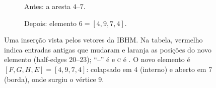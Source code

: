 \begin{figure}[ht]
\centering
\begin{subfigure}[b]{0.48\linewidth}\centering\caption{Antes: a aresta $4$--$7$.}\end{subfigure}\hfill
\begin{subfigure}[b]{0.48\linewidth}\centering\caption{Depois: elemento $6=[4,9,7,4]$.}\end{subfigure}
\par\medskip
{\scriptsize\setlength{\tabcolsep}{2.1pt}}
\caption{Uma inserção vista pelos vetores da IBHM. Na tabela, vermelho indica entradas antigas que mudaram e laranja as
posições do novo elemento (half-edges 20--23); ``--'' é \BORDER{} e \textsc{c} é \COLLAPSED. O novo elemento é
$[F,G,H,E]=[4,9,7,4]$: colapsado em 4 (interno) e aberto em 7 (borda), onde surgiu o vértice 9.}
\label{fig:insercao-vetores}
\end{figure}
